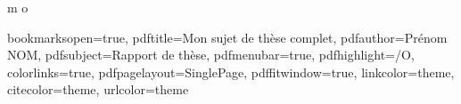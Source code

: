 \setcounter{DefaultLines}{3}
\setlength{\DefaultFindent}{0.5em}
\setlength{\DefaultNindent}{0em}
\renewcommand{\LettrineFontHook}{\usefont{U}{yinit}{m}{n}}
\renewcommand{\DefaultLoversize}{-0.65}



\usetikzlibrary{plotmarks}
\usepackage{pdfpages}

\usepackage{xparse}
\usepackage{tikz}
\usetikzlibrary{shapes.geometric,calc}
\DeclareDocumentCommand \circled
{ m o }{
}


\usepackage[strict]{changepage}
\newcommand\BackgroundPic{
\put(0,0){
\parbox[b][\paperheight]{\paperwidth}{%
\vfill
\centering
\texttt{[image: images/background-eps-converted-to]}%
\vfill
}}}

\usepackage{color}

\hypersetup
{
bookmarksopen=true,
pdftitle={Mon sujet de thèse complet},
pdfauthor={Prénom NOM},
pdfsubject={Rapport de thèse},
pdfmenubar=true,
pdfhighlight=/O,
colorlinks=true,
pdfpagelayout=SinglePage,
pdffitwindow=true,
linkcolor=theme,
citecolor=theme,
urlcolor=theme
}



\usepackage{fancyhdr}
\pagestyle{fancy}
\fancyfoot[LE,RO]{}
\fancyfoot[CE,CO]{}
\fancyhead[LE,RO]{\thepage}
\fancyhead[RE]{\color{black}\bfseries\nouppercase{\leftmark}}
\fancyhead[LO]{\color{black}\bfseries\nouppercase{\rightmark}}
\renewcommand{\headrulewidth}{1.5pt}
\renewcommand{\headrule}{\hbox to\headwidth{\color{black}\leaders\hrule height \headrulewidth\hfill}}
\renewcommand{\footrulewidth}{1pt}
\usepackage{afterpage}




